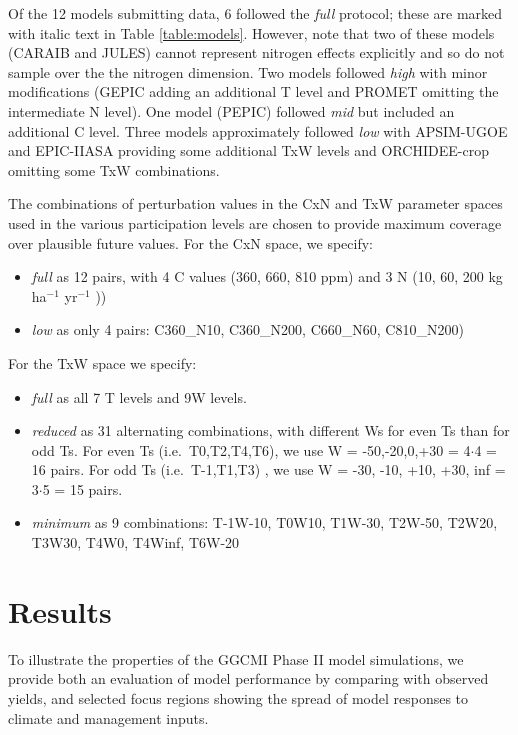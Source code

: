 \documentclass[gmd, manuscript]{copernicus} %
\begin{document}
Of the 12 models submitting data, 6 followed the \textit{full} protocol; these are marked with italic text in Table \ref{table:models}. However, note that two of these models (CARAIB and JULES) cannot represent nitrogen effects explicitly and so do not sample over the the nitrogen dimension. Two models followed \textit{high} with minor modifications (GEPIC adding an additional T level and PROMET omitting the intermediate N level). One model (PEPIC) followed \textit{mid} but included an additional C level. Three models approximately followed \textit{low} with APSIM-UGOE and EPIC-IIASA providing some additional TxW levels and ORCHIDEE-crop omitting some TxW combinations.  

The combinations of perturbation values in the CxN and TxW parameter spaces used in the various participation levels are chosen to provide maximum coverage over plausible future values. For the CxN space, we specify:
\begin{itemize}
\item \textit{full} as 12 pairs, with 4 C values (360, 660, 810 ppm) and 3 N (10, 60, 200 kg ha$^{-1}$ yr$^{-1}$ ))
\item \textit{low} as only 4 pairs: C360\_N10, C360\_N200, C660\_N60, C810\_N200) 
\end{itemize}
    
For the TxW space we specify:
\begin{itemize}
\item \textit{full} as all 7 T levels and 9W levels.
\item \textit{reduced} as 31 alternating combinations, with different Ws for even Ts than for odd Ts. For even Ts (i.e.\ T0,T2,T4,T6), we use W = -50,-20,0,+30 = 4$\cdot$4 = 16 pairs. For odd Ts (i.e.\ T-1,T1,T3) , we use W = -30, -10, +10, +30, inf = 3$\cdot$5 = 15 pairs.
\item \textit{minimum} as 9 combinations: T-1W-10, T0W10, T1W-30, T2W-50, T2W20, T3W30, T4W0, T4Winf, T6W-20
\end{itemize}

\section{Results}
\label{S:4}

To illustrate the properties of the GGCMI Phase II model simulations, we provide both an evaluation of model performance by comparing with observed yields, and selected focus regions showing the spread of model responses to climate and management inputs.
\end{document}
